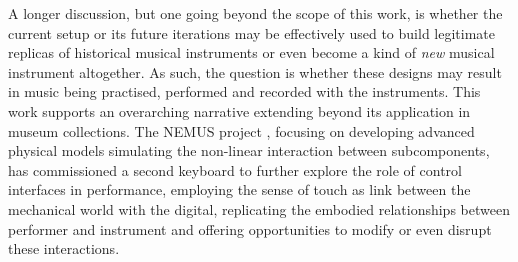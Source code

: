 A longer discussion, but one going beyond the scope of this work, is whether the
current setup or its future iterations may be effectively used to build
legitimate replicas of historical musical instruments or even become a kind of
\emph{new} musical instrument altogether. As such, the question is whether these
designs may result in music being practised, performed and recorded with the
instruments. This work supports an overarching narrative extending beyond its
application in museum collections. The NEMUS project
\cite{bologna_nemus_2024}, focusing on developing advanced physical models
simulating the non-linear interaction between subcomponents, has commissioned a
second keyboard to further explore the role of control interfaces in
performance, employing the sense of touch as link between the mechanical world
with the digital, replicating the embodied relationships between performer and
instrument and offering opportunities to modify or even disrupt these
interactions. 


